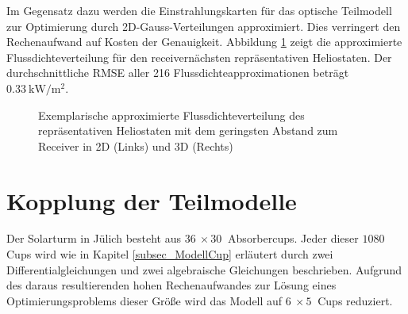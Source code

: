 Im Gegensatz dazu werden die Einstrahlungskarten für das optische Teilmodell zur Optimierung durch 2D-Gauss-Verteilungen approximiert.
Dies verringert den Rechenaufwand auf Kosten der Genauigkeit.
Abbildung \ref{fig_GaussFluxmap} zeigt die approximierte Flussdichteverteilung für den receivernächsten repräsentativen Heliostaten.
Der durchschnittliche RMSE aller 216 Flussdichteapproximationen beträgt $\SI{0.33}{\kilo\watt\per\metre\squared}$.

\begin{figure}[h!]
    \centering
    \setlength{\fboxsep}{1pt}
    \setlength{\fboxrule}{1pt}
    \caption[Exemplarische approximierte Flussdichteverteilung des repräsentativen Heliostaten mit dem geringsten Abstand zum Receiver in 2D und 3D]{Exemplarische approximierte Flussdichteverteilung des repräsentativen Heliostaten mit dem geringsten Abstand zum Receiver in 2D (Links) und 3D (Rechts)}
    \label{fig_GaussFluxmap}
\end{figure}

\newpage
\section{Kopplung der Teilmodelle} \label{sec_KopplungModelle}
Der Solarturm in Jülich besteht aus $\SI{36}{} \times \SI{30}{}$ Absorbercups.
Jeder dieser $1080$ Cups wird wie in Kapitel \ref{subsec_ModellCup} erläutert durch zwei Differentialgleichungen und zwei algebraische Gleichungen beschrieben.
Aufgrund des daraus resultierenden hohen Rechenaufwandes zur Lösung eines Optimierungsproblems dieser Größe wird das Modell auf $\SI{6}{} \times \SI{5}{}$ Cups reduziert.

